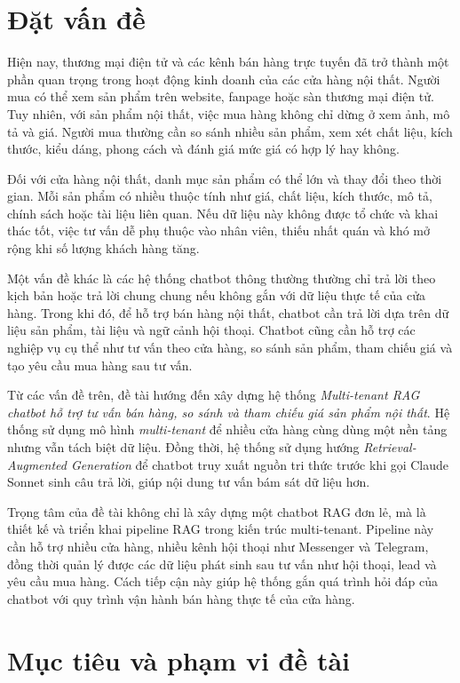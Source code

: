 \documentclass[../DoAn.tex]{subfiles}
\begin{document}
\section{Đặt vấn đề}
\label{section:1.1}

Hiện nay, thương mại điện tử và các kênh bán hàng trực tuyến đã trở thành một phần quan trọng trong hoạt động kinh doanh của các cửa hàng nội thất. Người mua có thể xem sản phẩm trên website, fanpage hoặc sàn thương mại điện tử. Tuy nhiên, với sản phẩm nội thất, việc mua hàng không chỉ dừng ở xem ảnh, mô tả và giá. Người mua thường cần so sánh nhiều sản phẩm, xem xét chất liệu, kích thước, kiểu dáng, phong cách và đánh giá mức giá có hợp lý hay không.

Đối với cửa hàng nội thất, danh mục sản phẩm có thể lớn và thay đổi theo thời gian. Mỗi sản phẩm có nhiều thuộc tính như giá, chất liệu, kích thước, mô tả, chính sách hoặc tài liệu liên quan. Nếu dữ liệu này không được tổ chức và khai thác tốt, việc tư vấn dễ phụ thuộc vào nhân viên, thiếu nhất quán và khó mở rộng khi số lượng khách hàng tăng.

Một vấn đề khác là các hệ thống chatbot thông thường thường chỉ trả lời theo kịch bản hoặc trả lời chung chung nếu không gắn với dữ liệu thực tế của cửa hàng. Trong khi đó, để hỗ trợ bán hàng nội thất, chatbot cần trả lời dựa trên dữ liệu sản phẩm, tài liệu và ngữ cảnh hội thoại. Chatbot cũng cần hỗ trợ các nghiệp vụ cụ thể như tư vấn theo cửa hàng, so sánh sản phẩm, tham chiếu giá và tạo yêu cầu mua hàng sau tư vấn.

Từ các vấn đề trên, đề tài hướng đến xây dựng hệ thống \textit{Multi-tenant RAG chatbot hỗ trợ tư vấn bán hàng, so sánh và tham chiếu giá sản phẩm nội thất}. Hệ thống sử dụng mô hình \textit{multi-tenant} để nhiều cửa hàng cùng dùng một nền tảng nhưng vẫn tách biệt dữ liệu. Đồng thời, hệ thống sử dụng hướng \textit{Retrieval-Augmented Generation} để chatbot truy xuất nguồn tri thức trước khi gọi Claude Sonnet sinh câu trả lời, giúp nội dung tư vấn bám sát dữ liệu hơn.

Trọng tâm của đề tài không chỉ là xây dựng một chatbot RAG đơn lẻ, mà là thiết kế và triển khai pipeline RAG trong kiến trúc multi-tenant. Pipeline này cần hỗ trợ nhiều cửa hàng, nhiều kênh hội thoại như Messenger và Telegram, đồng thời quản lý được các dữ liệu phát sinh sau tư vấn như hội thoại, lead và yêu cầu mua hàng. Cách tiếp cận này giúp hệ thống gắn quá trình hỏi đáp của chatbot với quy trình vận hành bán hàng thực tế của cửa hàng.

\section{Mục tiêu và phạm vi đề tài}
\label{section:1.2}
\end{document}
